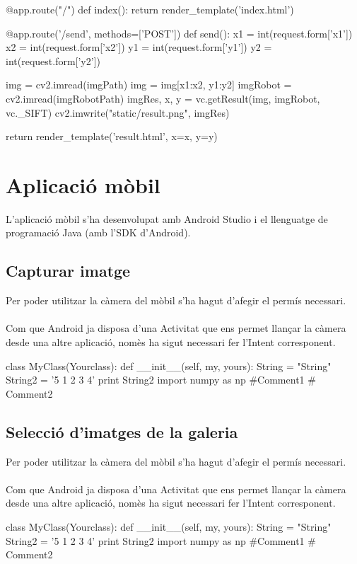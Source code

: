 		\begin{python}
@app.route("/")
def index():
	return render_template('index.html')

@app.route('/send', methods=['POST'])
def send():
	x1 = int(request.form['x1'])
	x2 = int(request.form['x2'])
	y1 = int(request.form['y1'])
	y2 = int(request.form['y2'])

	img = cv2.imread(imgPath)
	img = img[x1:x2, y1:y2]
	imgRobot = cv2.imread(imgRobotPath)
	imgRes, x, y = vc.getResult(img, imgRobot, vc._SIFT)
	cv2.imwrite("static/result.png", imgRes)

	return render_template('result.html', x=x, y=y)
		\end{python}


\section{Aplicació mòbil}
	L'aplicació mòbil s'ha desenvolupat amb Android Studio i el llenguatge de programació Java (amb l'SDK d'Android).
	\subsection{Capturar imatge}
		Per poder utilitzar la càmera del mòbil s'ha hagut d'afegir el permís necessari.\\\\
		Com que Android ja disposa d'una Activitat que ens permet llançar la càmera desde una altre aplicació, nomès ha sigut necessari fer l'Intent corresponent.\\
		\begin{java}
class MyClass(Yourclass):
  def __init__(self, my, yours):
    String = "String"
    String2 = '5 1 2 3 4'
    print String2
import numpy as np #Comment1
  # Comment2
		\end{java}
	\subsection{Selecció d'imatges de la galeria}
		Per poder utilitzar la càmera del mòbil s'ha hagut d'afegir el permís necessari.\\\\
		Com que Android ja disposa d'una Activitat que ens permet llançar la càmera desde una altre aplicació, nomès ha sigut necessari fer l'Intent corresponent.\\
		\begin{java}
class MyClass(Yourclass):
  def __init__(self, my, yours):
    String = "String"
    String2 = '5 1 2 3 4'
    print String2
import numpy as np #Comment1
  # Comment2
		\end{java}
